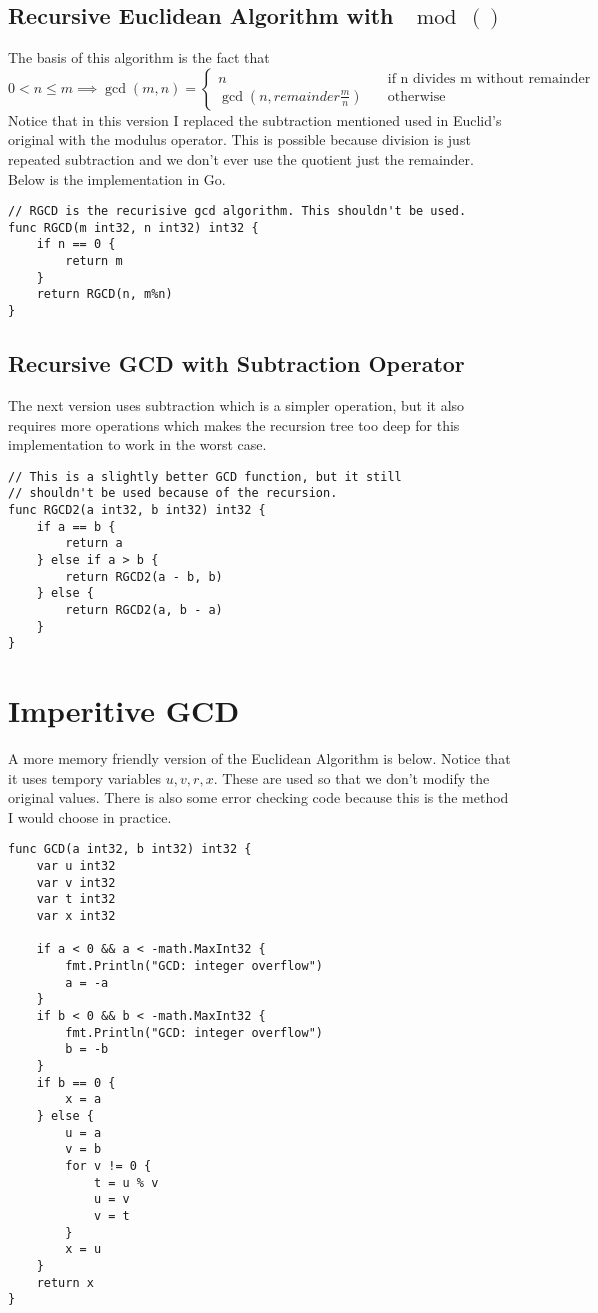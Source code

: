 \subsection{Recursive Euclidean Algorithm with $\mod()$}
The basis of this algorithm is the fact that
\[
0 < n \leq m \implies \gcd(m, n) =
\begin{cases}
	n \quad &\text{if n divides m without remainder} \\
	\gcd(n, remainder \frac{m}{n}) \quad &\text{otherwise}
\end{cases}
\]
Notice that in this version I replaced the subtraction mentioned used in Euclid's original with the modulus
operator. This is possible because division is just repeated subtraction and we don't ever use the quotient 
just the remainder. Below is the implementation in Go.

\begin{lstlisting}
// RGCD is the recurisive gcd algorithm. This shouldn't be used.
func RGCD(m int32, n int32) int32 {
	if n == 0 {
		return m
	}
	return RGCD(n, m%n)
}
\end{lstlisting}


\subsection{Recursive GCD with Subtraction Operator}
The next version uses subtraction which is a simpler operation, but it also requires more operations which makes the recursion
tree too deep for this implementation to work in the worst case.

\begin{lstlisting}
// This is a slightly better GCD function, but it still
// shouldn't be used because of the recursion.
func RGCD2(a int32, b int32) int32 {
	if a == b {
		return a
	} else if a > b {
		return RGCD2(a - b, b)
	} else {
		return RGCD2(a, b - a)
	}
}
\end{lstlisting}

\section{Imperitive GCD}
A more memory friendly version of the Euclidean Algorithm is below. Notice that it uses tempory variables $u, v, r, x$. These
are used so that we don't modify the original values. There is also some error checking code because this is the method
I would choose in practice. 

\begin{lstlisting}
func GCD(a int32, b int32) int32 {
	var u int32
	var v int32
	var t int32
	var x int32

	if a < 0 && a < -math.MaxInt32 {
		fmt.Println("GCD: integer overflow")
		a = -a
	}
	if b < 0 && b < -math.MaxInt32 {
		fmt.Println("GCD: integer overflow")
		b = -b
	}
	if b == 0 {
		x = a
	} else {
		u = a
		v = b
		for v != 0 {
			t = u % v
			u = v
			v = t
		}
		x = u
	}
	return x
}
\end{lstlisting}

